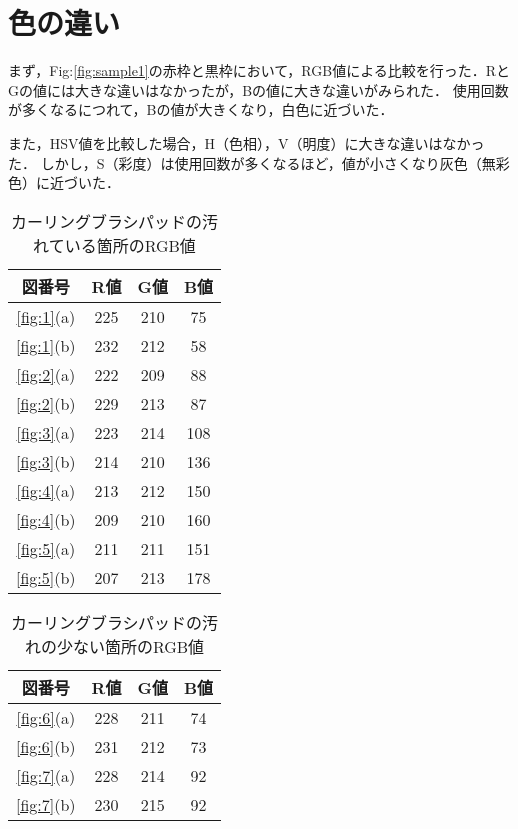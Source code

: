 \documentclass[main]{subfiles}
\begin{document}
\section{色の違い}

まず，Fig:\ref{fig:sample1}の赤枠と黒枠において，RGB値による比較を行った．RとGの値には大きな違いはなかったが，Bの値に大きな違いがみられた．
使用回数が多くなるにつれて，Bの値が大きくなり，白色に近づいた．

また，HSV値を比較した場合，H（色相），V（明度）に大きな違いはなかった．
しかし，S（彩度）は使用回数が多くなるほど，値が小さくなり灰色（無彩色）に近づいた．


\begin{table}[h]
    \caption{カーリングブラシパッドの汚れている箇所のRGB値}
    \label{table:RGB1}
    \centering
\begin{tabular}{c|c|c|c}
    図番号 & R値 & G値 & B値 \\ \hline
    \ref{fig:1}(a) & 225 & 210 & 75 \\ \hline
   \ref{fig:1}(b) & 232 & 212 & 58 \\ \hline\hline
   \ref{fig:2}(a) & 222 & 209 & 88 \\ \hline
   \ref{fig:2}(b) & 229 & 213 & 87 \\ \hline
   \ref{fig:3}(a) & 223 & 214 & 108 \\ \hline
   \ref{fig:3}(b) & 214 & 210 & 136 \\ \hline\hline
   \ref{fig:4}(a) & 213 & 212 & 150 \\ \hline
   \ref{fig:4}(b) & 209 & 210 & 160 \\ \hline
   \ref{fig:5}(a) & 211 & 211 & 151 \\ \hline
   \ref{fig:5}(b) & 207 & 213 & 178 \\ 
\end{tabular}    
\end{table}

\begin{table}[h]
    \caption{カーリングブラシパッドの汚れの少ない箇所のRGB値}
    \label{table:RGB2}
    \centering
\begin{tabular}{c|c|c|c}
    図番号 & R値 & G値 & B値 \\ \hline
   \ref{fig:6}(a) & 228 & 211 & 74 \\ \hline
   \ref{fig:6}(b) & 231 & 212 & 73 \\ \hline\hline
   \ref{fig:7}(a) & 228 & 214 & 92 \\ \hline
   \ref{fig:7}(b) & 230 & 215 & 92 \\ 
\end{tabular}    
\end{table}
\end{document}
